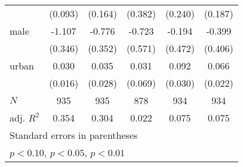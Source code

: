 {\begin{tabular}{l*{5}{c}}
            &     (0.093)         &     (0.164)         &     (0.382)         &     (0.240)         &     (0.187)         \\
[1em]
male        &      -1.107\sym{***}&      -0.776\sym{**} &      -0.723         &      -0.194         &      -0.399         \\
            &     (0.346)         &     (0.352)         &     (0.571)         &     (0.472)         &     (0.406)         \\
[1em]
urban       &       0.030\sym{*}  &       0.035         &       0.031         &       0.092\sym{***}&       0.066\sym{***}\\
            &     (0.016)         &     (0.028)         &     (0.069)         &     (0.030)         &     (0.022)         \\
\hline
\(N\)       &         935         &         935         &         878         &         934         &         934         \\
adj. \(R^{2}\)&       0.354         &       0.304         &       0.022         &       0.075         &       0.075         \\
\hline\hline
\multicolumn{6}{l}{\footnotesize Standard errors in parentheses}\\
\multicolumn{6}{l}{\footnotesize \sym{*} \(p<0.10\), \sym{**} \(p<0.05\), \sym{***} \(p<0.01\)}\\
\end{tabular}
}
